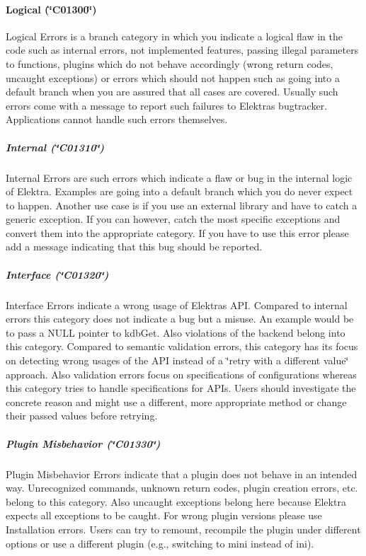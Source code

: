 \paragraph*{Logical (\char`\"{}\+C01300\char`\"{})}

{\ttfamily Logical Errors} is a branch category in which you indicate a logical flaw in the code such as internal errors, not implemented features, passing illegal parameters to functions, plugins which do not behave accordingly (wrong return codes, uncaught exceptions) or errors which should not happen such as going into a {\ttfamily default} branch when you are assured that all cases are covered. Usually such errors come with a message to report such failures to Elektra\textquotesingle{}s bugtracker. Applications cannot handle such errors themselves.

\subparagraph*{Internal (\char`\"{}\+C01310\char`\"{})}

{\ttfamily Internal Errors} are such errors which indicate a flaw or bug in the internal logic of Elektra. Examples are going into a {\ttfamily default} branch which you do never expect to happen. Another use case is if you use an external library and have to catch a generic exception. If you can however, catch the most specific exceptions and convert them into the appropriate category. If you have to use this error please add a message indicating that this bug should be reported.

\subparagraph*{Interface (\char`\"{}\+C01320\char`\"{})}

{\ttfamily Interface Errors} indicate a wrong usage of Elektra\textquotesingle{}s A\+PI. Compared to {\ttfamily internal} errors this category does not indicate a bug but a misuse. An example would be to pass a N\+U\+LL pointer to {\ttfamily kdb\+Get}. Also violations of the backend belong into this category. Compared to semantic validation errors, this category has its focus on detecting wrong usages of the A\+PI instead of a \char`\"{}retry with a
different value\char`\"{} approach. Also validation errors focus on specifications of configurations whereas this category tries to handle specifications for A\+P\+Is. Users should investigate the concrete reason and might use a different, more appropriate method or change their passed values before retrying.

\subparagraph*{Plugin Misbehavior (\char`\"{}\+C01330\char`\"{})}

{\ttfamily Plugin Misbehavior Errors} indicate that a plugin does not behave in an intended way. Unrecognized commands, unknown return codes, plugin creation errors, etc. belong to this category. Also uncaught exceptions belong here because Elektra expects all exceptions to be caught. For wrong plugin versions please use {\ttfamily Installation} errors. Users can try to remount, recompile the plugin under different options or use a different plugin (e.\+g., switching to {\ttfamily mini} instead of {\ttfamily ini}).

